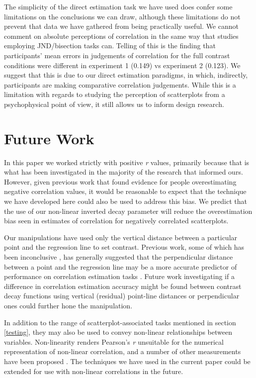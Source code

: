 \documentclass[preprint, 3p,
authoryear]{elsarticle} %
\begin{document}
The simplicity of the direct estimation task we have used does confer
some limitations on the conclusions we can draw, although these
limitations do not prevent that data we have gathered from being
practically useful. We cannot comment on absolute perceptions of
correlation in the same way that studies employing JND/bisection tasks
can. Telling of this is the finding that participants' mean errors in
judgements of correlation for the full contrast conditions were
different in experiment 1 (0.149) vs experiment 2 (0.123). We suggest
that this is due to our direct estimation paradigms, in which,
indirectly, participants are making comparative correlation judgements.
While this is a limitation with regards to studying the perception of
scatterplots from a psychophysical point of view, it still allows us to
inform design research.

\hypertarget{future-work}{%
\section{Future Work}\label{future-work}}

In this paper we worked strictly with positive \emph{r} values,
primarily because that is what has been investigated in the majority of
the research that informed ours. However, given previous work
\citep{sher_2017} that found evidence for people overestimating negative
correlation values, it would be reasonable to expect that the technique
we have developed here could also be used to address this bias. We
predict that the use of our non-linear inverted decay parameter will
reduce the overestimation bias seen in estimates of correlation for
negatively correlated scatterplots.

Our manipulations have used only the vertical distance between a
particular point and the regression line to set contrast. Previous work,
some of which has been inconclusive \citep{meyer_1997}, has generally
suggested that the perpendicular distance between a point and the
regression line may be a more accurate predictor of performance on
correlation estimation tasks
\citep{cleveland_1982, yang_2019, rensink_2017}. Future work
investigating if a difference in correlation estimation accuracy might
be found between contrast decay functions using vertical (residual)
point-line distances or perpendicular ones could further hone the
manipulation.

In addition to the range of scatterplot-associated tasks mentioned in
section \ref{testing}, they may also be used to convey non-linear
relationships between variables. Non-linearity renders Pearson's
\emph{r} unsuitable for the numerical representation of non-linear
correlation, and a number of other measurements have been proposed
\citep{laarne_2021}. The techniques we have used in the current paper
could be extended for use with non-linear correlations in the future.
\end{document}
